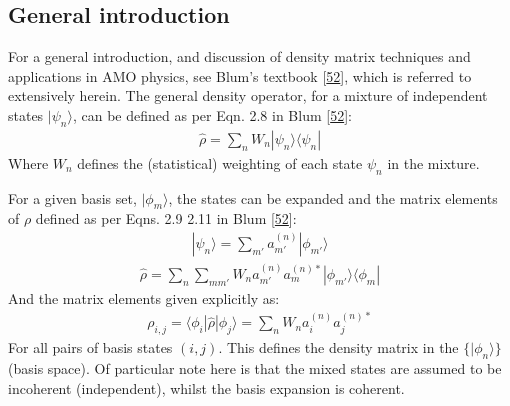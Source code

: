 \documentclass[letterpaper,table,10pt,english]{jupyterBook}
\begin{document}
\subsection{General introduction}
\label{\detokenize{part1/theory_density_matrices_310123:general-introduction}}\label{\detokenize{part1/theory_density_matrices_310123:sec-density-mat-intro}}
\sphinxAtStartPar
For a general introduction, and discussion of density matrix techniques and applications in AMO physics, see Blum’s textbook  {[}\hyperlink{cite.backmatter/bibliography:id444}{52}{]}, which is referred to extensively herein. The general density operator, for a mixture of independent states \(|\psi_{n}\rangle\), can be defined as per Eqn. 2.8 in Blum {[}\hyperlink{cite.backmatter/bibliography:id444}{52}{]}:
\begin{equation*}
\begin{split}
\hat{\rho}=\sum_{n}W_{n}|\psi_{n}\rangle\langle\psi_{n}|
\end{split}
\end{equation*}
\sphinxAtStartPar
Where \(W_{n}\) defines the (statistical) weighting of each state \(\psi_{n}\) in the mixture.

\sphinxAtStartPar
For a given basis set, \(|\phi_{m}\rangle\), the states can be expanded and the matrix elements of \(\rho\) defined as per Eqns. 2.9 \sphinxhyphen{} 2.11 in Blum {[}\hyperlink{cite.backmatter/bibliography:id444}{52}{]}:
\begin{equation*}
\begin{split}
| \psi_{n} \rangle = \sum_{m'} a_{m'}^{(n)}| \phi_{m'}\rangle
\end{split}
\end{equation*}\begin{equation}\label{equation:part1/theory_density_matrices_310123:eqn:density-mat-outer-prod}
\begin{split}
\hat{\rho}=\sum_{n}\sum_{mm'}W_{n}a_{m'}^{(n)}a_{m}^{(n)*}|\phi_{m'}\rangle\langle\phi_{m}|
\end{split}
\end{equation}
\sphinxAtStartPar
And the matrix elements \sphinxhyphen{}  \sphinxhyphen{} given explicitly as:
\begin{equation}\label{equation:part1/theory_density_matrices_310123:eqn:density-mat-generic}
\begin{split}
\rho_{i,j}=\langle\phi_{i}|\hat{\rho}|\phi_{j}\rangle=\sum_{n}W_{n}a_{i}^{(n)}a_{j}^{(n)*}
\end{split}
\end{equation}
\sphinxAtStartPar
For all pairs of basis states \((i,j)\). This defines the density matrix in the \(\{|\phi_n\rangle\}\)  (basis space). Of particular note here is that the mixed states are assumed to be incoherent (independent), whilst the basis expansion is coherent.
\end{document}
